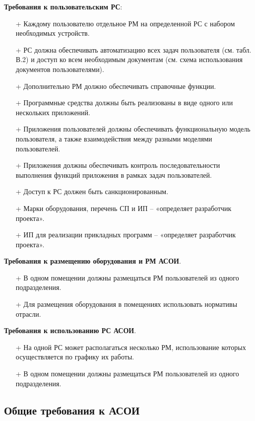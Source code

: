\documentclass[12pt, a4paper, simple]{eskdtext}
\begin{document}
    \textbf{Требования к пользовательским РС}:
    \begin{itemize}
        \item[+] Каждому пользователю отдельное РМ на определенной РС  с набором необходимых устройств.
        \item[+] РС должна обеспечивать автоматизацию всех задач пользователя (см. табл. В.2)
        и доступ ко всем необходимым документам (см. схема использования документов пользователями).
        \item[+] Дополнительно РМ должно обеспечивать справочные функции. 
        \item[+] Программные средства должны быть реализованы в виде одного или нескольких приложений.
        \item[+] Приложения пользователей должны обеспечивать функциональную модель пользователя,
        а также взаимодействия между разными моделями пользователей.
        \item[+] Приложения должны обеспечивать контроль последовательности выполнения функций приложения
        в рамках задач пользователей.
        \item[+] Доступ к РС должен быть санкционированным.
        \item[+] Марки оборудования, перечень СП и ИП – «определяет разработчик проекта».
        \item[+] ИП для реализации прикладных программ – «определяет разработчик проекта».
    \end{itemize}

    \textbf{Требования к размещению оборудования и РМ АСОИ}.
    \begin{itemize}
        \item[+] В одном помещении должны размещаться РМ пользователей из одного подразделения.
        \item[+] Для размещения оборудования в помещениях использовать нормативы отрасли.
    \end{itemize}

    \textbf{Требования к использованию РС АСОИ}.
    \begin{itemize}
        \item[+] На одной РС может располагаться несколько РМ, использование которых осуществляется по гра­фику их работы.
        \item[+] В одном помещении должны размещаться РМ пользователей из одного подразделения.
    \end{itemize}

    \subsection{Общие требования к АСОИ}
    
\end{document}
